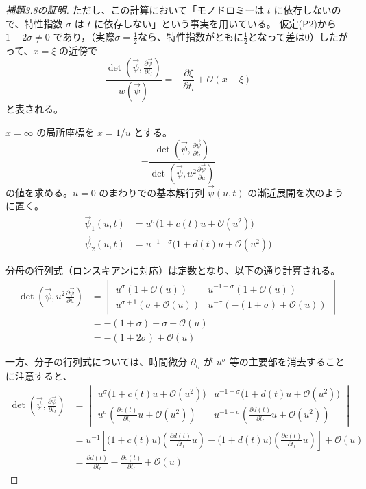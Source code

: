 \documentclass[paper=a4, fontsize=11pt]{jlreq} %
\newenvironment{story}{%
  \begin{mdframed}[
    backgroundcolor=red!5, %
    linewidth=0pt,         %
    innertopmargin=10pt,   %
    innerbottommargin=10pt,
    innerrightmargin=10pt, %
    innerleftmargin=10pt
  ]%
}{%
  \end{mdframed}%
}
\theoremstyle{break}
\theoremstyle{qa}
\begin{document}
\begin{story}
\begin{proof}[補題3.8の証明]
ただし、この計算において「モノドロミーは $t$ に依存しないので、特性指数 $\sigma$ は $t$ に依存しない」という事実を用いている。
仮定(P2)から $1-2\sigma \neq 0$ であり，（実際$\sigma=\frac{1}{2}$なら、特性指数がともに$\frac{1}{2}$となって差は0）したがって、$x=\xi$ の近傍で
\begin{equation*}
    \frac{\det \left( \vec{\psi}, \frac{\partial\vec{\psi}}{\partial t_l}\right)}{w(\vec{\psi})}=-\frac{\partial \xi}{\partial t_l} + \mathcal{O}(x-\xi)
\end{equation*}
と表される。

$x=\infty$ の局所座標を $x = 1/u$ とする。
\begin{equation}
    - \frac{\det\left(\vec{\psi}, \frac{\partial \vec{\psi}}{\partial t_l}\right)}{\det\left(\vec{\psi}, u^2 \frac{\partial \vec{\psi}}{\partial u}\right)} \label{eq:a2_inf_2}
\end{equation}
の値を求める。$u=0$ のまわりでの基本解行列 $\vec{\psi}(u,t)$ の漸近展開を次のように置く。
\begin{align*}
    \vec{\psi}_1(u,t) &= u^\sigma \big(1 + c(t)u + \mathcal{O}(u^2)\big) \\
    \vec{\psi}_2(u,t) &= u^{-1-\sigma} \big(1 + d(t)u + \mathcal{O}(u^2)\big)
\end{align*}

分母の行列式（ロンスキアンに対応）は定数となり、以下の通り計算される。
\begin{align*}
    \det\left(\vec{\psi}, u^2 \frac{\partial \vec{\psi}}{\partial u}\right) &= 
    \begin{vmatrix}
        u^\sigma (1 + \mathcal{O}(u)) & u^{-1-\sigma} (1 + \mathcal{O}(u)) \\[6pt]
        u^{\sigma+1} (\sigma + \mathcal{O}(u)) & u^{-\sigma} (-(1+\sigma) + \mathcal{O}(u))
    \end{vmatrix} \\[8pt]
    &= -(1+\sigma) - \sigma + \mathcal{O}(u) \\
    &= -(1+2\sigma) + \mathcal{O}(u)
\end{align*}

一方、分子の行列式については、時間微分 $\partial_{t_l}$ が $u^\sigma$ 等の主要部を消去することに注意すると、
\begin{align*}
    \det\left(\vec{\psi}, \frac{\partial \vec{\psi}}{\partial t_l}\right) &= 
    \begin{vmatrix}
        u^\sigma \big(1 + c(t)u + \mathcal{O}(u^2)\big) & u^{-1-\sigma} \big(1 + d(t)u + \mathcal{O}(u^2)\big) \\[6pt]
        u^\sigma \left(\frac{\partial c(t)}{\partial t_l}u + \mathcal{O}(u^2)\right) & u^{-1-\sigma} \left(\frac{\partial d(t)}{\partial t_l}u + \mathcal{O}(u^2)\right)
    \end{vmatrix} \\[8pt]
    &= u^{-1} \left[ \big(1 + c(t)u\big)\left(\frac{\partial d(t)}{\partial t_l}u\right) - \big(1 + d(t)u\big)\left(\frac{\partial c(t)}{\partial t_l}u\right) \right] + \mathcal{O}(u) \\[4pt]
    &= \frac{\partial d(t)}{\partial t_l} - \frac{\partial c(t)}{\partial t_l} + \mathcal{O}(u)
\end{align*}


\end{proof}
\end{story}
\end{document}
